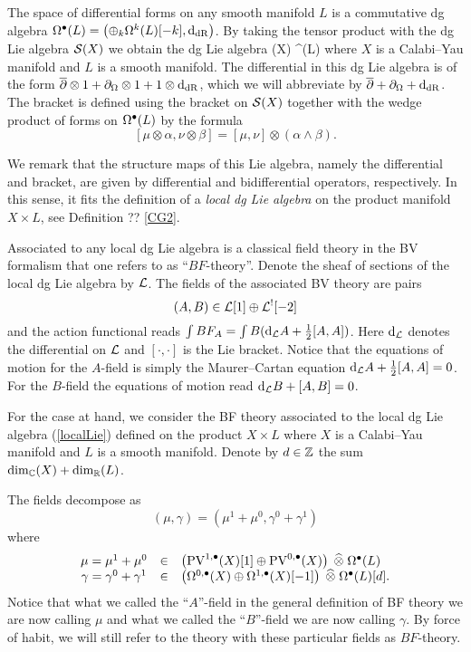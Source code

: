 \documentclass[11pt]{amsart}
\def\pv{{\rm PV}}
\begin{document}
The space of differential forms on any smooth manifold $L$ is a commutative dg algebra $\Omega^{\bullet}(L) = \left(\oplus_{k}\Omega^{k}(L)[-k], {\rm d}_{{\rm dR}}\right)$.
By taking the tensor product with the dg Lie algebra $\mathcal S(X)$ we obtain the dg Lie algebra
\beqn\label{localLie}
  \cS(X) \; \Hat{\otimes} \; \Omega^{\bu}(L)
\eeqn
where $X$ is a Calabi--Yau manifold and $L$ is a smooth manifold.
The differential in this dg Lie algebra is of the form $\overline{\partial} \otimes 1 + \partial_\Omega \otimes 1 + 1 \otimes {\rm d}_{\rm dR}$, which we will abbreviate by $\overline{\partial} + \partial_\Omega + {\rm d}_{\rm dR}$.
The bracket is defined using the bracket on $\mathcal S(X)$ together with the wedge product of forms on $\Omega^\bullet(L)$ by the formula
\[
  [\mu \otimes \alpha, \nu \otimes \beta] = [\mu, \nu] \otimes (\alpha \wedge \beta) .
\]


We remark that the structure maps of this Lie algebra, namely the differential and bracket, are given by differential and bidifferential operators, respectively.
In this sense, it fits the definition of a {\em local dg Lie algebra} on the product manifold $X \times L$, see Definition ?? \ref{CG2}.

Associated to any local dg Lie algebra is a classical field theory in the BV formalism that one refers to as ``$BF$-theory''.
Denote the sheaf of sections of the local dg Lie algebra by $\mathcal L$.
The fields of the associated BV theory are pairs
\[
  (A, B) \in \mathcal L[1] \oplus \mathcal L^{!}[-2]
\]
and the action functional reads $\int B F_{A} = \int B ({\rm d}_{\mathcal L}A + \frac12 [A,A])$.
Here ${\rm d}_{\mathcal L}$ denotes the differential on $\mathcal L$ and $[\cdot,\cdot]$ is the Lie bracket.
Notice that the equations of motion for the $A$-field is simply the Maurer--Cartan equation ${\rm d}_\mathcal L A + \frac12 [A,A] = 0$.
For the $B$-field the equations of motion read ${\rm d}_\mathcal L B + [A, B] = 0$.

For the case at hand, we consider the BF theory associated to the local dg Lie algebra (\ref{localLie}) defined on the product $X \times L$ where $X$ is a Calabi--Yau manifold and $L$ is a smooth manifold.
Denote by $d \in \mathbb Z$ the sum $\dim_{\mathbb C}(X) + \dim_{\mathbb R}(L)$.

The fields decompose as
\[
(\mu, \gamma) = (\mu^1 + \mu^0, \gamma^0 + \gamma^1)
\]
where
\[
  \begin{array}{ccl}
    \mu = \mu^1+\mu^0 & \in & \left(\pv^{1,\bu}(X)[1] \oplus \pv^{0,\bu}(X) \right) \; \Hat{\otimes} \; \Omega^{\bu}(L) \\
    \gamma = \gamma^0 + \gamma^1 & \in & \left(\Omega^{0,\bu}(X) \oplus \Omega^{1,\bu}(X)[-1] \right) \; \Hat{\otimes}\; \Omega^{\bu}(L)[d] .
  \end{array}
\]
Notice that what we called the ``$A$''-field in the general definition of BF theory we are now calling $\mu$ and what we called the ``$B$''-field we are now calling $\gamma$.
By force of habit, we will still refer to the theory with these particular fields as $BF$-theory.
\end{document}
